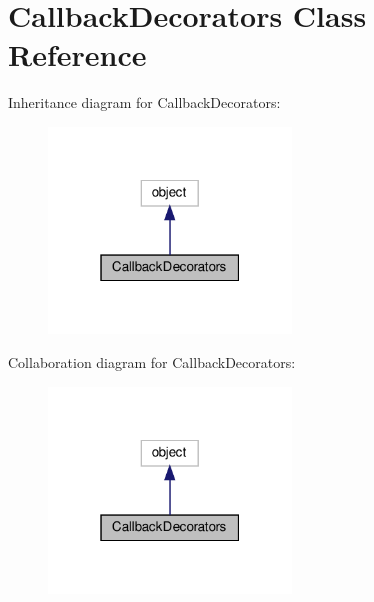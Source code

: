 \hypertarget{classvlc_1_1_callback_decorators}{}\section{Callback\+Decorators Class Reference}
\label{classvlc_1_1_callback_decorators}


Inheritance diagram for Callback\+Decorators\+:
\nopagebreak
\begin{figure}[H]
\begin{center}
\leavevmode
\includegraphics[width=183pt]{classvlc_1_1_callback_decorators__inherit__graph}
\end{center}
\end{figure}


Collaboration diagram for Callback\+Decorators\+:
\nopagebreak
\begin{figure}[H]
\begin{center}
\leavevmode
\includegraphics[width=183pt]{classvlc_1_1_callback_decorators__coll__graph}
\end{center}
\end{figure}
